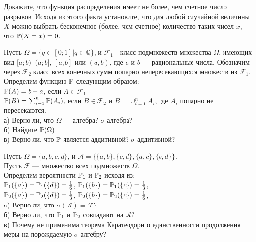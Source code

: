 \begin{solution}
\begin{solution}
\begin{solution}
\begin{solution}
\end{solution}

\begin{problem}
Докажите, что функция распределения имеет не более, чем счетное
число разрывов. Исходя из этого факта установите, что для любой
случайной величины $X$ можно выбрать бесконечное (более, чем
счетное) количество таких чисел $x$, что $\P(X=x)=0$. 
\end{problem} 
\begin{solution} 

\end{solution}

\begin{problem}
Пусть $\Omega=\{q\in[0;1]|q\in\mathbb{Q}\}$, и $\mathcal{F}_{1}$ -
класс подмножеств множества $\Omega$, имеющих вид $[a;b)$,
$(a;b]$, $[a,b]$ или $(a,b)$, где $a$ и $b$ --- рациональные числа.
Обозначим через $\mathcal{F}_{2}$ класс всех конечных сумм попарно
непересекающихся множеств из $\mathcal{F}_{1}$. Определим
функцию $\P$ следующим образом: \\
$\P(A)=b-a$, если $A\in \mathcal{F}_{1}$ \\
$\P(B)=\sum_{i=1}^{n}\P(A_{i})$, если $B\in
\mathcal{F}_{2}$ и $B=\cup_{i=1}^{n}A_{i}$, где $A_{i}$ попарно не
пересекаются. \\
а) Верно ли, что $\Omega$ --- алгебра? $\sigma$-алгебра? \\
б) Найдите $\P(\Omega)$ \\
в) Верно ли, что $\P$ является аддитивной?
$\sigma$-аддитивной? 
\end{problem} 
\begin{solution} 

\end{solution}

\begin{problem}
Пусть $\Omega=\{a,b,c,d\}$, и
$\mathcal{A}=\{\{a,b\},\{c,d\},\{a,c\},\{b,d\}\}$. \\
Пусть $\mathcal{F}$ --- множество всех подмножеств $\Omega$. \\
Определим вероятности $\P_{1}$ и $\P_{2}$ исходя
из: \\
$\P_{1}(\{a\})=\P_{1}(\{d\})=\frac{1}{6}$,
$\P_{1}(\{b\})=\P_{1}(\{c\})=\frac{1}{3}$, \\
$\P_{2}(\{a\})=\P_{2}(\{d\})=\frac{1}{3}$,
$\P_{2}(\{b\})=\P_{2}(\{c\})=\frac{1}{6}$, \\
a) Верно ли, что $\sigma(\mathcal{A})=\mathcal{F}$? \\
б) Верно ли, что $\P_{1}$ и $\P_{2}$ совпадают на
$\mathcal{A}$? \\
в) Почему не применима теорема Каратеодори о единственности
продолжения меры на порождаемую $\sigma$-алгебру? 
\end{problem} 
\begin{solution} 


\end{solution}
\end{solution}
\end{solution}
\end{solution}
